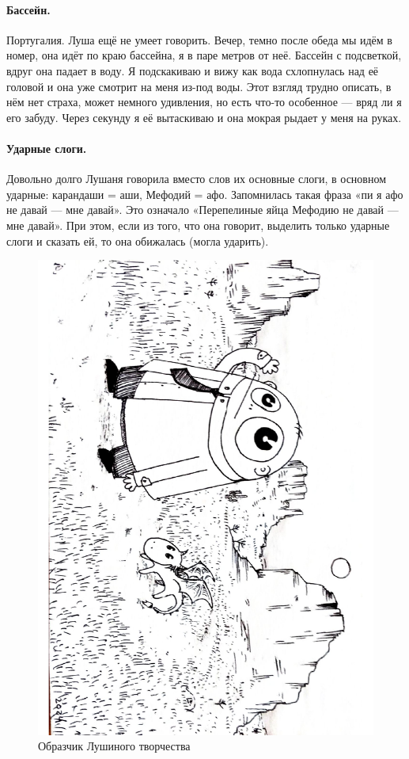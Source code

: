 \documentclass{book}
\begin{document}
\paragraph{Бассейн.} Португалия.
Луша ещё не умеет говорить.
Вечер, темно после обеда мы идём в номер, она идёт по краю бассейна, я в паре метров от неё.
Бассейн с подсветкой, вдруг она падает в воду.
Я подскакиваю и вижу как вода схлопнулась над её головой и она уже смотрит на меня из-под воды.
Этот взгляд трудно описать, в нём нет страха, может немного удивления, но есть что-то особенное --- вряд ли я его забуду.
Через секунду я её вытаскиваю и она мокрая рыдает у меня на руках.

\paragraph{Ударные слоги.} Довольно долго Лушаня говорила вместо слов их основные слоги, в основном ударные: карандаши = аши, Мефодий = афо.
Запомнилась такая фраза «пи я афо не давай --- мне давай».
Это означало «Перепелиные яйца Мефодию не давай --- мне давай».
При этом, если из того, что она говорит, выделить только ударные слоги и сказать ей, то она обижалась (могла ударить).


\begin{figure}[t!]
\centering
\includegraphics[scale=.35,angle=90]{pics/lusha-13.01.2024}
\caption*{Образчик Лушиного творчества}
\end{figure}
\end{document}
